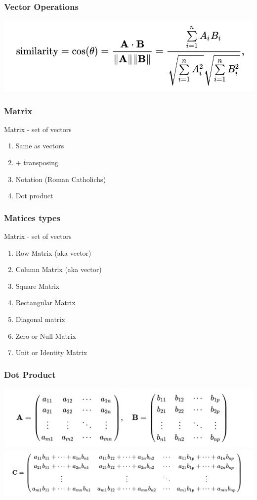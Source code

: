 \documentclass[t, 11pt]{beamer}
\begin{document}
\begin{frame} 
	\frametitle{\insertsection} 
	\frametitle{Vector Operations} 
	\includegraphics[scale=0.7]{cos}	
\end{frame}	
	
\begin{frame} 
	\frametitle{\insertsection} 
	\frametitle{Matrix} 
	Matrix - set of vectors  
	\begin{enumerate}
		\item Same as vectors
		\item + transposing
		\item Notation (Roman Catholichs)
		\item Dot product 
	\end{enumerate}
	
\end{frame}

\begin{frame} 
	\frametitle{\insertsection} 
	\frametitle{Matices types} 
	Matrix - set of vectors  
	\begin{enumerate}
		\item Row Matrix (aka vector)
		\item Column Matrix (aka vector)
		\item Square Matrix
		\item Rectangular Matrix
		\item Diagonal matrix
		\item Zero or Null Matrix
		\item Unit or Identity Matrix
	\end{enumerate}
\end{frame}

\begin{frame} 
	\frametitle{\insertsection} 
	\frametitle{Dot  Product} 
	\includegraphics[scale=0.6]{ABmat}	
	\includegraphics[scale=0.5]{Cmat}	
\end{frame}	
\end{document}
